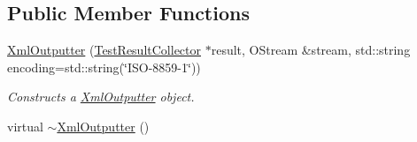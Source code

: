 \subsection*{Public Member Functions}
\begin{DoxyCompactItemize}
\item 
\hyperlink{class_xml_outputter_af98780d86b93b9eb2aa440c752d5ed6f}{Xml\+Outputter} (\hyperlink{class_test_result_collector}{Test\+Result\+Collector} $\ast$result, O\+Stream \&stream, std\+::string encoding=std\+::string(\char`\"{}I\+SO-\/8859-\/1\char`\"{}))
\begin{DoxyCompactList}\small\item\em Constructs a \hyperlink{class_xml_outputter}{Xml\+Outputter} object. \end{DoxyCompactList}\item 
virtual \hyperlink{class_xml_outputter_a159ce827427e235d8f2db9719acbba94}{$\sim$\+Xml\+Outputter} ()\hypertarget{class_xml_outputter_a159ce827427e235d8f2db9719acbba94}{}\label{class_xml_outputter_a159ce827427e235d8f2db9719acbba94}


\end{DoxyCompactItemize}
